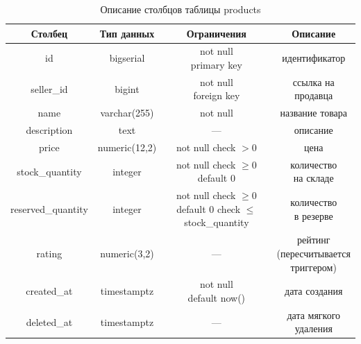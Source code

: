 \begin{table}[H]
    \caption{Описание столбцов таблицы products}
    \label{tbl:t_products}
    \rpzcompacttable
    \begin{tabular}[]{|c|c|c|c|}
        \hline
        \textbf{Столбец} & \textbf{Тип данных} & \textbf{Ограничения} & \textbf{Описание} \\ \hline
        id & bigserial & \makecell{not null \\ primary key} & идентификатор \\ \hline
        seller\_id & bigint & \makecell{not null \\ foreign key} & \makecell{ссылка на\\продавца} \\ \hline
        name & varchar(255) & not null & название товара \\ \hline
        description & text & --- & описание \\ \hline
        price & numeric(12,2) & \makecell{not null \\ check $> 0$} & цена \\ \hline
        stock\_quantity & integer & \makecell{not null \\ check $\geq 0$ \\ default 0} & \makecell{количество\\на складе} \\ \hline
        reserved\_quantity & integer & \makecell{not null \\ check $\geq 0$ \\ default 0 \\ check $\leq$\\stock\_quantity} & \makecell{количество\\в резерве} \\ \hline
        rating & numeric(3,2) & --- & \makecell{рейтинг\\(пересчитывается\\триггером)} \\ \hline
        created\_at & timestamptz & \makecell{not null \\ default now()} & дата создания \\ \hline
        deleted\_at & timestamptz & --- & \makecell{дата мягкого\\удаления} \\ \hline
    \end{tabular}
\end{table}

